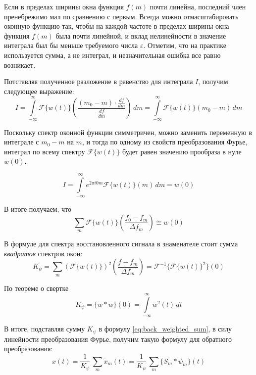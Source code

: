Если в пределах ширины окна функция $f(m)$ почти линейна, последний член пренебрежимо мал по сравнению с первым. 
Всегда можно отмасштабировать оконную функцию так, чтобы на каждой частоте в пределах ширины окна функция $f(m)$ была почти линейной, 
и вклад нелинейности в значение интеграла был бы меньше требуемого числа $\varepsilon$. Отметим, что на практике используется сумма, 
а не интеграл, и незначительная ошибка все равно возникает.

Потставляя полученное разложение в равенство для интеграла $I$, получим следующее выражение:
\begin{equation}
  I = 
  \int \limits_{-\infty}^\infty \mathcal{F}\{w(t)\} \left(\frac{(m_0 - m) \cdot \frac{df}{dm}}{\frac{df}{dm}}\right) \, dm = 
  \int \limits_{-\infty}^\infty \mathcal{F}\{w(t)\} \left(m_0 - m\right) \, dm
\end{equation}

Поскольку спектр оконной функции симметричен, можно заменить переменную в интеграле с $m_0 - m$ на $m$, 
и тогда по одному из свойств преобразования Фурье, интеграл по всему спектру $\mathcal{F}\{w(t)\}$ будет равен значению прообраза в нуле $w(0)$.

\begin{equation}
  I = 
  \int \limits_{-\infty}^\infty e^{2\pi i 0 m} \mathcal{F}\{w(t)\} (m) \, dm = w(0)
\end{equation}

В итоге получаем, что 
\begin{equation}
  \sum \limits_m \mathcal{F}\{w(t)\} \left(\frac{f_0 - f_m}{\Delta f_m}\right)  \cong  w(0)
\end{equation}

В формуле для спектра восстановленного сигнала в знаменателе стоит сумма \textit{квадратов} спектров окон:
\begin{equation}
  K_{\psi} = \sum \limits_m (\mathcal{F}\{w(t)\})^2 \left(\frac{f - f_m}{\Delta f_m}\right) = \mathcal{F}^{-1}\{\mathcal{F}\{w(t)\}^2\}(0)
\end{equation}

По теореме о свертке
\begin{equation}
  K_{\psi} = \{w * w\}(0) = \int \limits_{-\infty}^\infty w^2(t) \, dt
\end{equation}

В итоге, подставляя сумму $K_{\psi}$ в формулу \ref{eq:back_weighted_sum}, в силу линейности преобразования Фурье, 
получим такую формулу для обратного преобразования:
\begin{equation}
  x(t) = \frac{1}{K_{\psi}} \, \sum \limits_m \tilde{x}_m(t) = \frac{1}{K_{\psi}} \, \sum \limits_m \{S_m * \psi_m\}(t)
\end{equation}

